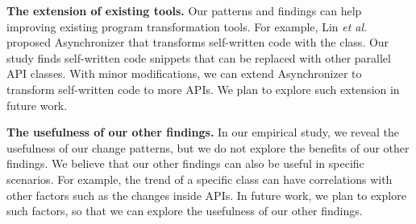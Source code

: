 \noindent
\textbf{The extension of existing tools.} Our patterns and findings can help improving existing program transformation tools. For example,  Lin \emph{et al.}~\cite{conf/sigsoft/LinRD14} proposed Asynchronizer that transforms self-written code with the  class. Our study finds self-written code snippets that can be replaced with other parallel API classes. With minor modifications, we can extend Asynchronizer to transform self-written code to more APIs. We plan to explore such extension in future work.

\noindent
\textbf{The usefulness of our other findings.} In our empirical study, we reveal the usefulness of our change patterns, but we do not explore the benefits of our other findings. We believe that our other findings can also be useful in specific scenarios. For example, the trend of a specific class can have correlations with other factors such as the changes inside APIs. In future work, we plan to explore such factors, so that we can explore the usefulness of our other findings.
